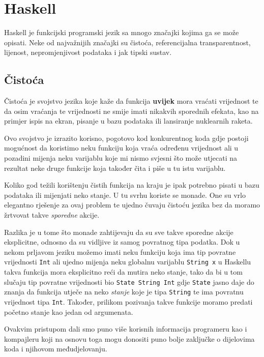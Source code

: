 \chapter{Haskell}

Haskell je funkcijski programski jezik sa mnogo značajki kojima ga se može opisati. Neke od najvažnijih značajki su čistoća, referencijalna transparentnost, lijenost, nepromjenjivost podataka i jak tipski sustav.

\section{Čistoća}

Čistoća je svojstvo jezika koje kaže da funkcija \textbf{uvijek} mora vraćati vrijednost te da osim vraćanja te vrijednosti ne smije imati nikakvih sporednih efekata, kao na primjer ispis na ekran, pisanje u bazu podataka ili lansiranje nuklearnih raketa.

Ovo svojstvo je izrazito korisno, pogotovo kod konkurentnog koda gdje postoji mogućnost da koristimo neku funkciju koja vraća određenu vrijednost ali u pozadini mijenja neku varijablu koje mi nismo svjesni što može utjecati na rezultat neke druge funkcije koja također čita i piše u tu istu varijablu.

Koliko god težili korištenju čistih funkcija na kraju je ipak potrebno pisati u bazu podataka ili mijenjati neko stanje. U tu svrhu koriste se monade. One su vrlo elegantno rješenje za ovaj problem te ujedno čuvaju čistoću jezika bez da moramo žrtvovat takve \textit{sporedne} akcije.

Razlika je u tome što monade zahtijevaju da su sve takve sporedne akcije eksplicitne, odnosno da su vidljive iz samog povratnog tipa podatka. Dok u nekom prljavom jeziku možemo imati neku funkciju koja ima tip povratne vrijednosti \texttt{Int} ali ujedno mijenja neku globalnu varijablu \texttt{String x} u Haskellu takva funkcija mora eksplicitno reći da mutira neko stanje, tako da bi u tom slučaju tip povratne vrijednosti bio \texttt{State String Int} gdje \texttt{State} jasno daje do znanja da funkcija utječe na neko \textit{stanje} koje je tipa \texttt{String} te ima povratnu vrijednost tipa \texttt{Int}. Također, prilikom pozivanja takve funkcije moramo predati početno stanje kao jedan od argumenata.

Ovakvim pristupom dali smo puno više korisnih informacija programeru kao i kompajleru koji na osnovu toga mogu donositi puno bolje zaključke o dijelovima koda i njihovom međudjelovanju.

